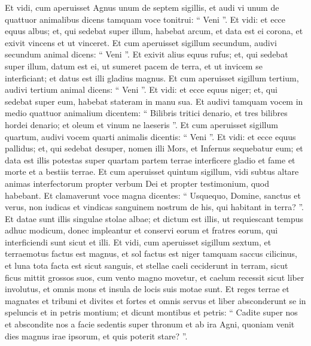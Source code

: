 \begin{biblechapter}
\begin{biblechapter}
\begin{biblechapter}
\begin{biblechapter}
\begin{biblechapter}
\begin{biblechapter}
\verse Et vidi, cum aperuisset Agnus unum de septem sigillis, et audi vi unum de quattuor animalibus dicens tamquam voce tonitrui: “ Veni ”. 
\verse Et vidi: et ecce equus albus; et, qui sedebat super illum, habebat arcum, et data est ei corona, et exivit vincens et ut vinceret.
 \verse Et cum aperuisset sigillum secundum, audivi secundum animal dicens: “ Veni ”. 
 \verse Et exivit alius equus rufus; et, qui sedebat super illum, datum est ei, ut sumeret pacem de terra, et ut invicem se interficiant; et datus est illi gladius magnus.
 \verse Et cum aperuisset sigillum tertium, audivi tertium animal dicens: “ Veni ”. Et vidi: et ecce equus niger; et, qui sedebat super eum, habebat stateram in manu sua. 
\verse Et audivi tamquam vocem in medio quattuor animalium dicentem: “ Bilibris tritici denario, et tres bilibres hordei denario; et oleum et vinum ne laeseris ”.
 \verse Et cum aperuisset sigillum quartum, audivi vocem quarti animalis dicentis: “ Veni ”. 
\verse Et vidi: et ecce equus pallidus; et, qui sedebat desuper, nomen illi Mors, et Infernus sequebatur eum; et data est illis potestas super quartam partem terrae interficere gladio et fame et morte et a bestiis terrae.
 \verse Et cum aperuisset quintum sigillum, vidi subtus altare animas interfectorum propter verbum Dei et propter testimonium, quod habebant. 
\verse Et clamaverunt voce magna dicentes: “ Usquequo, Domine, sanctus et verus, non iudicas et vindicas sanguinem nostrum de his, qui habitant in terra? ”.
 \verse Et datae sunt illis singulae stolae albae; et dictum est illis, ut requiescant tempus adhuc modicum, donec impleantur et conservi eorum et fratres eorum, qui interficiendi sunt sicut et illi.
 \verse Et vidi, cum aperuisset sigillum sextum, et terraemotus factus est magnus, et sol factus est niger tamquam saccus cilicinus, et luna tota facta est sicut sanguis, 
\verse et stellae caeli ceciderunt in terram, sicut ficus mittit grossos suos, cum vento magno movetur, 
\verse et caelum recessit sicut liber involutus, et omnis mons et insula de locis suis motae sunt. 
\verse Et reges terrae et magnates et tribuni et divites et fortes et omnis servus et liber absconderunt se in speluncis et in petris montium; 
\verse et dicunt montibus et petris: “ Cadite super nos et abscondite nos a facie sedentis super thronum et ab ira Agni, 
\verse quoniam venit dies magnus irae ipsorum, et quis poterit stare? ”.
 

\end{biblechapter}
\end{biblechapter}
\end{biblechapter}
\end{biblechapter}
\end{biblechapter}
\end{biblechapter}
